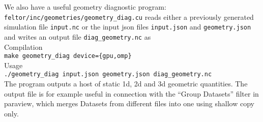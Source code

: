 We also have a useful geometry diagnostic program:
\texttt{feltor/inc/geometries/geometry\_diag.cu} reads either a previously
generated simulation file \texttt{input.nc} or the input json files
\texttt{input.json} and \texttt{geometry.json} and writes an output file \texttt{diag\_geometry.nc} as\\
Compilation\\
\texttt{make geometry\_diag device=\{gpu,omp\}} \\
Usage \\
\texttt{./geometry\_diag input.json geometry.json diag\_geometry.nc} \\
The program outputs a host of static 1d, 2d and 3d geometric quantities.
The output file is for example useful in connection with the ``Group Datasets'' filter in paraview, which merges Datasets from different files into one using shallow copy only.
